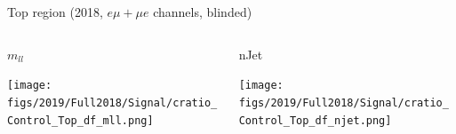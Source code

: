 \documentclass[9pt]{beamer}
\begin{document}
\begin{frame}{Top region (2018, $e \mu + \mu e$ channels, blinded)}
\begin{columns}
		\begin{column}{0.32\textwidth}
			\begin{center}
				\begin{block}{\centering $m_{ll}$}\end{block}
     			\texttt{[image: figs/2019/Full2018/Signal/cratio\_Control\_Top\_df\_mll.png]}
    		\end{center}		
		\end{column} \hfill
		\begin{column}{0.32\textwidth}
			\begin{center}
\begin{block}{\centering nJet}\end{block}
     			\texttt{[image: figs/2019/Full2018/Signal/cratio\_Control\_Top\_df\_njet.png]}
    		\end{center}		
		\end{column} \hfill
	\end{columns}
\end{frame}
\end{document}
